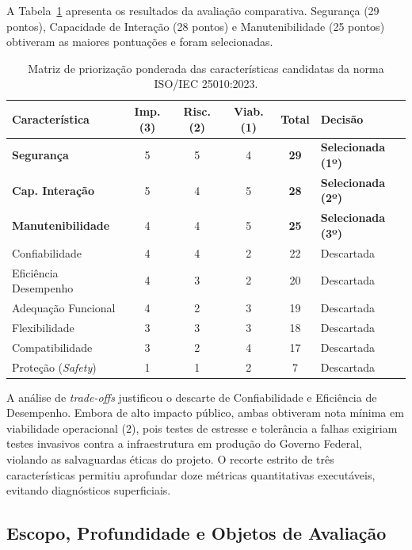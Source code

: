 \documentclass[journal]{IEEEtran}
\begin{document}
A Tabela~\ref{tab:priorizacao} apresenta os resultados da avaliação comparativa. Segurança (29 pontos), Capacidade de Interação (28 pontos) e Manutenibilidade (25 pontos) obtiveram as maiores pontuações e foram selecionadas. 

\begin{table}[!t]
\centering
\caption{Matriz de priorização ponderada das características candidatas da norma ISO/IEC 25010:2023.}
\label{tab:priorizacao}
\small
\begin{tabular}{@{}l c c c c l@{}}
\toprule
\textbf{Característica} & \textbf{Imp. (3)} & \textbf{Risc. (2)} & \textbf{Viab. (1)} & \textbf{Total} & \textbf{Decisão} \\
\midrule
\textbf{Segurança} & 5 & 5 & 4 & \textbf{29} & \textbf{Selecionada (1º)} \\
\textbf{Cap. Interação} & 5 & 4 & 5 & \textbf{28} & \textbf{Selecionada (2º)} \\
\textbf{Manutenibilidade} & 4 & 4 & 5 & \textbf{25} & \textbf{Selecionada (3º)} \\
Confiabilidade & 4 & 4 & 2 & 22 & Descartada \\
Eficiência Desempenho & 4 & 3 & 2 & 20 & Descartada \\
Adequação Funcional & 4 & 2 & 3 & 19 & Descartada \\
Flexibilidade & 3 & 3 & 3 & 18 & Descartada \\
Compatibilidade & 3 & 2 & 4 & 17 & Descartada \\
Proteção (\textit{Safety}) & 1 & 1 & 2 & 7 & Descartada \\
\bottomrule
\end{tabular}
\end{table}

A análise de \textit{trade-offs} justificou o descarte de Confiabilidade e Eficiência de Desempenho. Embora de alto impacto público, ambas obtiveram nota mínima em viabilidade operacional ($2$), pois testes de estresse e tolerância a falhas exigiriam testes invasivos contra a infraestrutura em produção do Governo Federal, violando as salvaguardas éticas do projeto. O recorte estrito de três características permitiu aprofundar doze métricas quantitativas executáveis, evitando diagnósticos superficiais.

\subsection{Escopo, Profundidade e Objetos de Avaliação}
\label{sec:escopo}
\end{document}
